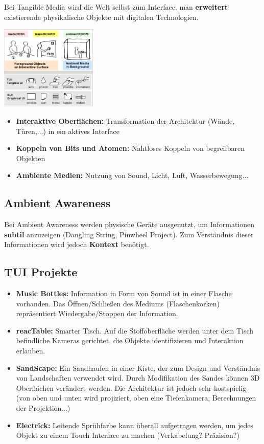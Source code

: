 \documentclass[a4paper]{article}
\begin{document}
Bei Tangible Media wird die Welt selbst zum Interface, man \textbf{erweitert} existierende physikalische Objekte mit digitalen Technologien.
\begin{center}
	\includegraphics[height = 4cm]{TUI.png}
\end{center}
\begin{itemize}
	\item \textbf{Interaktive Oberflächen:} Transformation der Architektur (Wände, Türen,...) in ein aktives Interface
	\item \textbf{Koppeln von Bits und Atomen:} Nahtloses Koppeln von begreifbaren Objekten
	\item \textbf{Ambiente Medien:} Nutzung von Sound, Licht, Luft, Wasserbewegung...
\end{itemize}
\subsection{Ambient Awareness}
Bei Ambient Awareness werden physische Geräte ausgenutzt, um Informationen \textbf{subtil} anzuzeigen (Dangling String, Pinwheel Project). Zum Verständnis dieser Informationen wird jedoch \textbf{Kontext} benötigt.
\subsection{TUI Projekte}
\begin{itemize}
	\item \textbf{Music Bottles:} Information in Form von Sound ist in einer Flasche vorhanden. Das Öffnen/Schließen des Mediums (Flaschenkorken) repräsentiert Wiedergabe/Stoppen der Information.
	\item \textbf{reacTable:} Smarter Tisch. Auf die Stoffoberfläche werden unter dem Tisch befindliche Kameras gerichtet, die Objekte identifizieren und Interaktion erlauben. 
	\item \textbf{SandScape:} Ein Sandhaufen in einer Kiste, der zum Design und Verständnis von Landschaften verwendet wird. Durch Modifikation des Sandes können 3D Oberflächen verändert werden. Die Architektur ist jedoch sehr kostspielig (von oben und unten wird projiziert, oben eine Tiefenkamera, Berechnungen der Projektion...)
	\item \textbf{Electrick:} Leitende Sprühfarbe kann überall aufgetragen werden, um jedes Objekt zu einem Touch Interface zu machen (Verkabelung? Präzision?)
\end{itemize}
\end{document}

